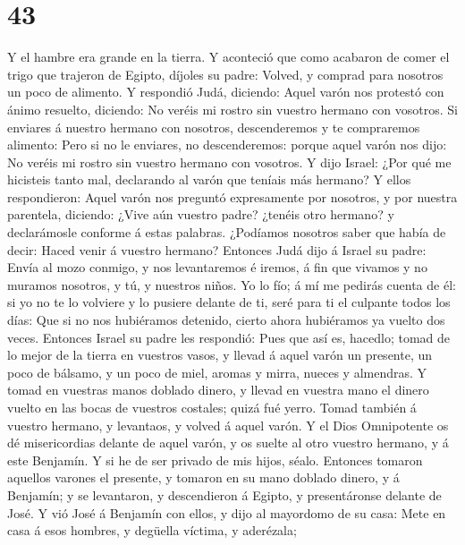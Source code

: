 \hypertarget{section-42}{%
\section{43}\label{section-42}}

 Y el hambre era grande en la tierra.  Y
aconteció que como acabaron de comer el trigo que trajeron de Egipto,
díjoles su padre: Volved, y comprad para nosotros un poco de alimento.
 Y respondió Judá, diciendo: Aquel varón nos protestó con
ánimo resuelto, diciendo: No veréis mi rostro sin vuestro hermano con
vosotros.  Si enviares á nuestro hermano con nosotros,
descenderemos y te compraremos alimento:  Pero si no le
enviares, no descenderemos: porque aquel varón nos dijo: No veréis mi
rostro sin vuestro hermano con vosotros.  Y dijo Israel:
¿Por qué me hicisteis tanto mal, declarando al varón que teníais más
hermano?  Y ellos respondieron: Aquel varón nos preguntó
expresamente por nosotros, y por nuestra parentela, diciendo: ¿Vive aún
vuestro padre? ¿tenéis otro hermano? y declarámosle conforme á estas
palabras. ¿Podíamos nosotros saber que había de decir: Haced venir á
vuestro hermano?  Entonces Judá dijo á Israel su padre:
Envía al mozo conmigo, y nos levantaremos é iremos, á fin que vivamos y
no muramos nosotros, y tú, y nuestros niños.  Yo lo fío; á
mí me pedirás cuenta de él: si yo no te lo volviere y lo pusiere delante
de ti, seré para ti el culpante todos los días:  Que si no
nos hubiéramos detenido, cierto ahora hubiéramos ya vuelto dos veces.
 Entonces Israel su padre les respondió: Pues que así es,
hacedlo; tomad de lo mejor de la tierra en vuestros vasos, y llevad á
aquel varón un presente, un poco de bálsamo, y un poco de miel, aromas y
mirra, nueces y almendras.  Y tomad en vuestras manos
doblado dinero, y llevad en vuestra mano el dinero vuelto en las bocas
de vuestros costales; quizá fué yerro.  Tomad también á
vuestro hermano, y levantaos, y volved á aquel varón.  Y el
Dios Omnipotente os dé misericordias delante de aquel varón, y os suelte
al otro vuestro hermano, y á este Benjamín. Y si he de ser privado de
mis hijos, séalo.  Entonces tomaron aquellos varones el
presente, y tomaron en su mano doblado dinero, y á Benjamín; y se
levantaron, y descendieron á Egipto, y presentáronse delante de José.
 Y vió José á Benjamín con ellos, y dijo al mayordomo de su
casa: Mete en casa á esos hombres, y degüella víctima, y aderézala;
